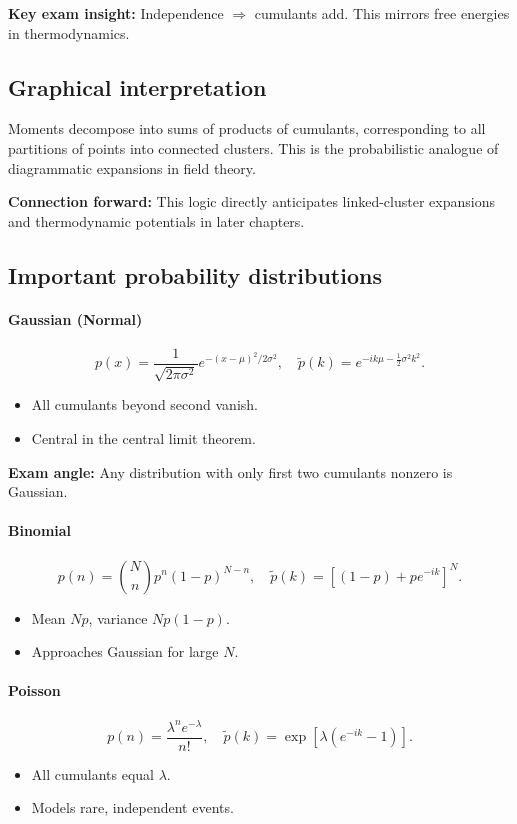 \documentclass[9pt,twocoloumn]{article}
\begin{document}
\textbf{Key exam insight:} Independence $\Rightarrow$ cumulants add. This mirrors free energies in thermodynamics.

\subsection*{Graphical interpretation}
Moments decompose into sums of products of cumulants, corresponding to all partitions of points into connected clusters. This is the probabilistic analogue of diagrammatic expansions in field theory.

\textbf{Connection forward:} This logic directly anticipates linked-cluster expansions and thermodynamic potentials in later chapters.

\subsection*{Important probability distributions}

\paragraph{Gaussian (Normal)}
\[
p(x)=\frac{1}{\sqrt{2\pi\sigma^2}}e^{-(x-\mu)^2/2\sigma^2},
\quad
\tilde p(k)=e^{-ik\mu-\frac{1}{2}\sigma^2k^2}.
\]
\begin{itemize}
\item All cumulants beyond second vanish.
\item Central in the central limit theorem.
\end{itemize}
\textbf{Exam angle:} Any distribution with only first two cumulants nonzero is Gaussian.

\paragraph{Binomial}
\[
p(n)=\binom{N}{n}p^n(1-p)^{N-n},
\quad
\tilde p(k)=[(1-p)+pe^{-ik}]^N.
\]
\begin{itemize}
\item Mean $Np$, variance $Np(1-p)$.
\item Approaches Gaussian for large $N$.
\end{itemize}

\paragraph{Poisson}
\[
p(n)=\frac{\lambda^n e^{-\lambda}}{n!},
\quad
\tilde p(k)=\exp[\lambda(e^{-ik}-1)].
\]
\begin{itemize}
\item All cumulants equal $\lambda$.
\item Models rare, independent events.
\end{itemize}
\end{document}

